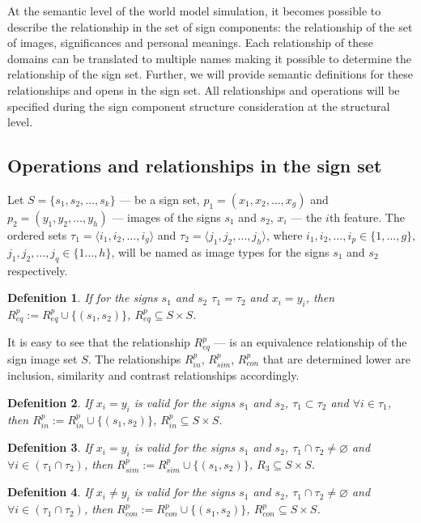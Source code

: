 \documentclass[review]{elsarticle}
\newtheorem{definition}{Defenition}
\begin{document}
At the semantic level of the world model simulation, it becomes possible to describe the relationship in the set of sign components: the relationship of the set of images, significances and personal meanings. Each relationship of these domains can be translated to multiple names making it possible to determine the relationship of the sign set. Further, we will provide semantic definitions for these relationships and opens in the sign set. All relationships and operations will be specified during the sign component structure consideration at the structural level.


\subsection{Operations and relationships in the sign set}
Let $S=\{s_1,s_2,\dots,s_k\}$ --- be a sign set, $p_1=(x_1,x_2,\dots,x_g)$ and $p_2=(y_1,y_2,\dots,y_h)$ --- images of the signs $s_1$ and $s_2$, $x_i$ --- the $i$th feature. The ordered sets $\tau_1=\langle i_1,i_2,\dots,i_g\rangle$ and $\tau_2=\langle j_1,j_2,\dots,j_h\rangle$, where $i_1,i_2,\dots,i_p\in\{1,\dots,g\}$, $j_1,j_2,\dots,j_q\in\{1\dots,h\}$, will be named as image types for the signs $s_1$ and $s_2$ respectively.

\begin{definition}
	If for the signs $s_1$ and $s_2$ $\tau_1=\tau_2$ and $x_i=y_i$, then $R^p_{eq}:=R^p_{eq}\cup\{(s_1,s_2)\}$, $R^p_{eq}\subseteq S\times S$.
\end{definition}

It is easy to see that the relationship $R^p_{eq}$ --- is an equivalence relationship of the sign image set $S$. The relationships $R^p_{in}$, $R^p_{sim}$, $R^p_{con}$ that are determined lower are inclusion, similarity and contrast relationships accordingly.

\begin{definition}
	If $x_i=y_i$ is valid for the signs  $s_1$ and $s_2$, $\tau_1\subset\tau_2$ and $\forall i\in\tau_1$, then $R^p_{in}:=R^p_{in}\cup\{(s_1,s_2)\}$, $R^p_{in}\subseteq S\times S$.
\end{definition}

\begin{definition}
	If $x_i=y_i$ is valid for the signs $s_1$ and $s_2$, $\tau_1\cap\tau_2\not =\varnothing$ and $\forall i\in(\tau_1\cap\tau_2)$, then $R^p_{sim}:=R^p_{sim}\cup\{(s_1,s_2)\}$, $R_3\subseteq S\times S$.
\end{definition}

\begin{definition}
	If $x_i\not =y_i$ is valid for the signs $s_1$ and $s_2$, $\tau_1\cap\tau_2\not =\varnothing$ and $\forall i\in(\tau_1\cap\tau_2)$, then $R^p_{con}:=R^p_{con}\cup\{(s_1,s_2)\}$, $R^p_{con}\subseteq S\times S$.
\end{definition}
\end{document}
